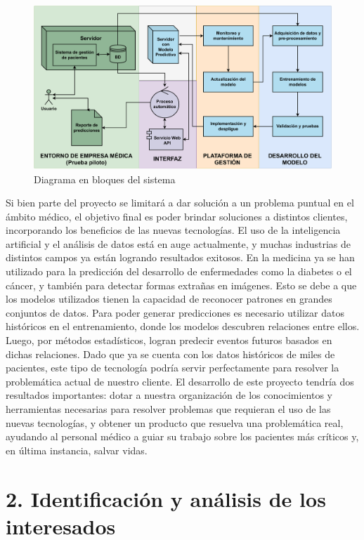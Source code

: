 \documentclass[
11pt, %
]{charter}
\begin{document}
\begin{figure}[htpb]
\centering 
\includegraphics[width=.7\textwidth]{./Figuras/DiagramaDeBloques.pdf}
\caption{Diagrama en bloques del sistema}
\label{fig:diagBloques}
\end{figure}

Si bien parte del proyecto se limitará a dar solución a un problema puntual en el ámbito médico, el objetivo final es poder brindar soluciones a distintos clientes, incorporando los beneficios de las nuevas tecnologías.
El uso de la inteligencia artificial y el análisis de datos está en auge actualmente, y muchas industrias de distintos campos ya están logrando resultados exitosos. En la medicina ya se han utilizado para la predicción del desarrollo de enfermedades como la diabetes o el cáncer, y también para detectar formas extrañas en imágenes. 
Esto se debe a que los modelos utilizados tienen la capacidad de reconocer patrones en grandes conjuntos de datos.
Para poder generar predicciones es necesario utilizar datos históricos en el entrenamiento, donde los modelos descubren relaciones entre ellos. Luego, por métodos estadísticos, logran predecir eventos futuros basados en dichas relaciones.
Dado que ya se cuenta con los datos históricos de miles de pacientes, este tipo de tecnología podría servir perfectamente para resolver la problemática actual de nuestro cliente. 
El desarrollo de este proyecto tendría dos resultados importantes: dotar a nuestra organización de los conocimientos y herramientas necesarias para resolver problemas que requieran el uso de las nuevas tecnologías, y obtener un producto que resuelva una problemática real, ayudando al personal médico a guiar su trabajo sobre los pacientes más críticos y, en última instancia, salvar vidas.

\section{2. Identificación y análisis de los interesados}
\label{sec:interesados}
\end{document}
